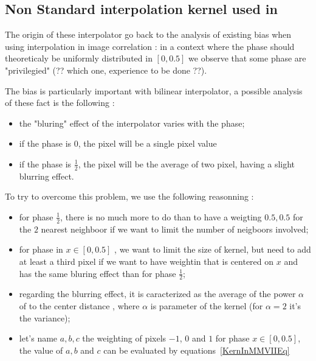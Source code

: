 \subsection{Non Standard interpolation kernel used in \PPP}

\label{MMVIIInterpol}

The origin of these interpolator go back to the analysis of existing bias when using interpolation
in image correlation : in a context where the phase should theoreticaly be uniformly 
distributed in $[0,0.5]$ we  observe that some phase are "privilegied"  (?? which one, experience to be done ??).

The bias is particularly important with bilinear interpolator, a possible
analysis of these fact is the following :

\begin{itemize}
    \item  the "bluring" effect of the interpolator varies with the phase;
    \item  if the phase is $0$, the pixel will be a single pixel value 
    \item  if the phase is $\frac{1}{2}$, the pixel will be the average of two
           pixel, having a slight blurring effect.
\end{itemize}

To try to overcome this problem, we use the following reasonning :

\begin{itemize}
    \item  for phase  $\frac{1}{2}$, there is no much more to do than to have
           a weigting $0.5,0.5$ for the $2$ nearest neighboor if we want to limit the number of neigboors
           involved;
    \item  for phase  in $x \in [0,0.5]$ , we want to limit the size of kernel,
           but need to add at least a third pixel if we want to have weightin
           that is centered on $x$ and has the same bluring effect than for phase $\frac{1}{2}$;
    \item  regarding the blurring effect, it is caracterized as the average of the power $\alpha$ of 
           to the center distance , where $\alpha$ is parameter of the kernel (for $\alpha=2$ it's the
           variance);
     \item let's name $a,b,c$ the weighting of pixels $-1$, $0$ and $1$ for phase $x \in [0,0.5]$, the value
           of $a,b$ and $c$ can be evaluated by equations~\ref{KernInMMVIIEq}
\end{itemize}

